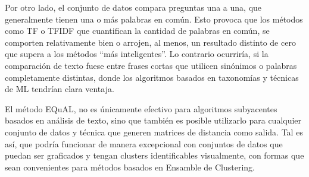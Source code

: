 \bigskip Por otro lado, el conjunto de datos compara preguntas una a una, que generalmente tienen una o más palabras en común. Esto provoca que los métodos como TF o TFIDF que cuantifican la cantidad de palabras en común, se comporten relativamente bien o arrojen, al menos, un  resultado distinto de cero que supera a los métodos “más inteligentes”. Lo contrario ocurriría, si la comparación de texto fuese entre frases cortas que utilicen sinónimos o palabras completamente distintas, donde los algoritmos basados en taxonomías y técnicas de ML tendrían clara ventaja.

\bigskip El método EQuAL, no es únicamente efectivo para algoritmos subyacentes basados en análisis de texto, sino que también es posible utilizarlo para cualquier conjunto de datos y técnica que generen matrices de distancia como salida. Tal es así, que podría funcionar de manera excepcional con conjuntos de datos que puedan ser graficados y tengan clusters identificables visualmente, con formas que sean convenientes para métodos basados en Ensamble de Clustering.
